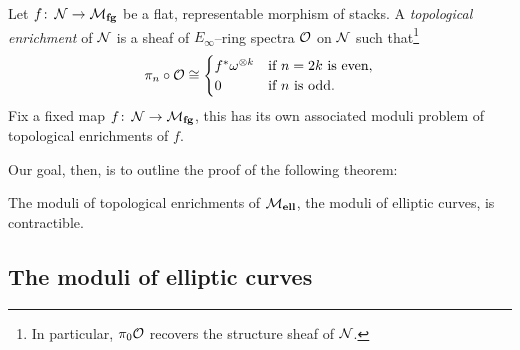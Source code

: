 \begin{definition}
Let $f\colon\thinspace \mathcal{N} \to \mathcal{M}_{\mathbf{fg}}$ be a flat, representable morphism of stacks.  A \textit{topological enrichment} of $\mathcal{N}$ is a sheaf of $E_\infty$--ring spectra $\mathcal{O}$ on $\mathcal{N}$ such that\footnote{In particular, $\pi_0 \mathcal{O}$ recovers the structure sheaf of $\mathcal{N}$.} \[\pi_n \circ \mathcal{O} \cong \begin{cases} f^* \omega^{\otimes k} & \text{if $n = 2k$ is even}, \\ 0 & \text{if $n$ is odd}. \end{cases}\]  Fix a fixed map $f\colon\thinspace \mathcal{N} \to \mathcal{M}_{\mathbf{fg}}$, this has its own associated moduli problem of topological enrichments of $f$.
\end{definition}

Our goal, then, is to outline the proof of the following theorem:

\begin{theorem}\label{UniqueTopEnrichmentOfMell}
The moduli of topological enrichments of $\mathcal{M}_{\mathbf{ell}}$, the moduli of elliptic curves, is contractible.
\end{theorem}



\subsection*{The moduli of elliptic curves}

